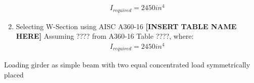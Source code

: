 \documentclass{report} %
\begin{document}
\begin{enumerate}
        \begin{equation*}
            \begin{aligned}
                I_{required} = 2450in^4
            \end{aligned}
        \end{equation*}
    \item Selecting W-Section using AISC A360-16 \textbf{[INSERT TABLE NAME HERE]}
    Assuming ???? from A360-16 Table ????, where:
        \begin{equation*}
            \begin{aligned}
                I_{required} = 2450in^4
            \end{aligned}
        \end{equation*}
\end{enumerate}
\begin{center}
\end{center}
Loading girder as simple beam with two equal concentrated load symmetrically placed  

\newpage
\end{document}
